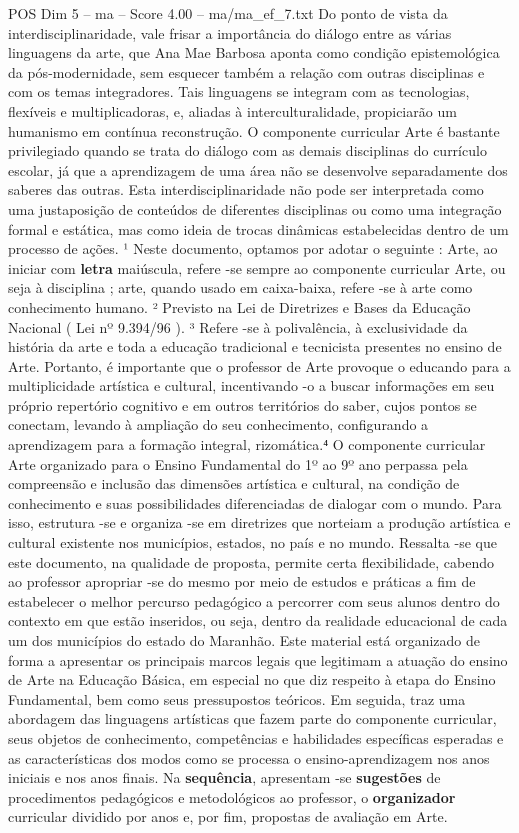 \begin{textsample}{POS Dim 5 – ma – Score 4.00 – ma/ma\_ef\_7.txt}
Do ponto de vista da interdisciplinaridade, vale frisar a importância do diálogo entre as várias linguagens da arte, que Ana Mae Barbosa aponta como condição epistemológica da pós-modernidade, sem esquecer também a relação com outras disciplinas e com os temas integradores.
Tais linguagens se integram com as tecnologias, flexíveis e multiplicadoras, e, aliadas à interculturalidade, propiciarão um humanismo em contínua reconstrução.
O componente curricular Arte é bastante privilegiado quando se trata do diálogo com as demais disciplinas do currículo escolar, já que a aprendizagem de uma área não se desenvolve separadamente dos saberes das outras.
Esta interdisciplinaridade não pode ser interpretada como uma justaposição de conteúdos de diferentes disciplinas ou como uma integração formal e estática, mas como ideia de trocas dinâmicas estabelecidas dentro de um processo de ações. ¹ Neste documento, optamos por adotar o seguinte : Arte, ao iniciar com \textbf{letra} maiúscula, refere -se sempre ao componente curricular Arte, ou seja à disciplina ; arte, quando usado em caixa-baixa, refere -se à arte como conhecimento humano. ² Previsto na Lei de Diretrizes e Bases da Educação Nacional ( Lei nº 9.394/96 ). ³ Refere -se à polivalência, à exclusividade da história da arte e toda a educação tradicional e tecnicista presentes no ensino de Arte.
Portanto, é importante que o professor de Arte provoque o educando para a multiplicidade artística e cultural, incentivando -o a buscar informações em seu próprio repertório cognitivo e em outros territórios do saber, cujos pontos se conectam, levando à ampliação do seu conhecimento, configurando a aprendizagem para a formação integral, rizomática.⁴ O componente curricular Arte organizado para o Ensino Fundamental do 1º ao 9º ano perpassa pela compreensão e inclusão das dimensões artística e cultural, na condição de conhecimento e suas possibilidades diferenciadas de dialogar com o mundo.
Para isso, estrutura -se e organiza -se em diretrizes que norteiam a produção artística e cultural existente nos municípios, estados, no país e no mundo.
Ressalta -se que este documento, na qualidade de proposta, permite certa flexibilidade, cabendo ao professor apropriar -se do mesmo por meio de estudos e práticas a fim de estabelecer o melhor percurso pedagógico a percorrer com seus alunos dentro do contexto em que estão inseridos, ou seja, dentro da realidade educacional de cada um dos municípios do estado do Maranhão.
Este material está organizado de forma a apresentar os principais marcos legais que legitimam a atuação do ensino de Arte na Educação Básica, em especial no que diz respeito à etapa do Ensino Fundamental, bem como seus pressupostos teóricos.
Em seguida, traz uma abordagem das linguagens artísticas que fazem parte do componente curricular, seus objetos de conhecimento, competências e habilidades específicas esperadas e as características dos modos como se processa o ensino-aprendizagem nos anos iniciais e nos anos finais.
Na \textbf{sequência}, apresentam -se \textbf{sugestões} de procedimentos pedagógicos e metodológicos ao professor, o \textbf{organizador} curricular dividido por anos e, por fim, propostas de avaliação em Arte.

\end{textsample}
